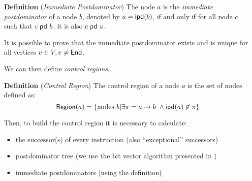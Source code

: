 \documentclass [a4paper,twoside]{article}
\begin{document}
\textbf{Definition} (\textit{Immediate Postdominator}) The node $a$ is
the \textit{immediate postdominator} of a node $b$, denoted by
$a=\textsf{ipd}(b)$, if and only if for all node $c$ such that $c\ \textsf{pd} \ b$,
it is also $c\ \textsf{pd} \ a$.

It is possible to prove that the immediate postdominator exists and is unique for all vertices $v \in V, v \neq \textsf{End}$.

We can then define \emph{control regions}.

\textbf{Definition} (\textit{Control Region}) The control region of a
node $a$ is the set of nodes defined as:
\begin{displaymath}
  \mathsf{Region}(a) = \{ \text{nodes } b | \exists \pi=a\rightarrow b \  \land \textsf{ipd}(a) \not\in \pi\}
\end{displaymath}


Then, to build the control region it is necessary to calculate:
\begin{itemize}
\item the successor(s) of every instruction (also ``exceptional'' successors)
\item postdominator tree (we use the bit vector algorithm presented in \cite{aho-sethi-ullman}) 
\item immediate postdominators (using the definition)
\end{itemize}
\end{document}

